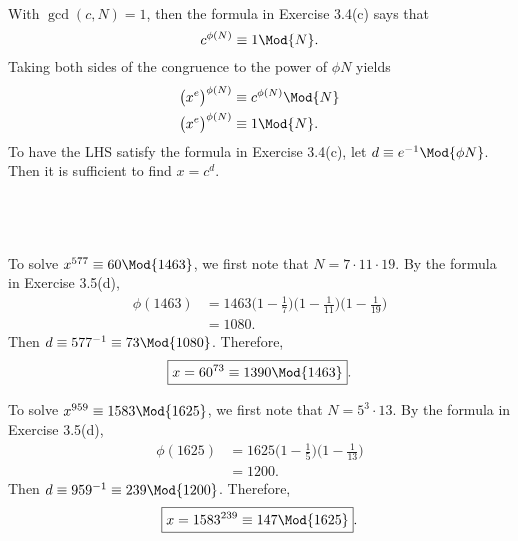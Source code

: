 \documentclass[
  coursecode={MTHE 418},
  assignmentname={Homework \homeworknumber},
  studentnumber=20053722,
  name={Bryan Hoang},
  draft,
]{
  ltxanswer%
}
\date{2022-02-28}
\begin{document}
  \begin{questions}
    \setcounter{question}{\questionnumber}
    \addtocounter{question}{-1}
    \question[10]\
    \begin{parts}
      \part{}
      \begin{solution}
        With \(\gcd(c, N) = 1\), then the formula in
        Exercise 3.4(c) says that
        \begin{equation}
          c^{\phi(N)} \equiv 1 \Mod{N}.
        \end{equation}
        Taking both sides of the congruence to the power of \(\phi{N}\) yields
        \begin{align*}
          \bigl(x^{e}\bigr)^{\phi(N)} &\equiv c^{\phi(N)} \Mod{N} \\
          \bigl(x^{e}\bigr)^{\phi(N)} &\equiv 1 \Mod{N}.
        \end{align*}
        To have the LHS satisfy the formula in Exercise 3.4(c), let \(d \equiv e^{-1} \Mod{\phi{N}}\). Then it is sufficient to find \(x = c^{d}\).
      \end{solution}

      \part{}\
      \begin{subparts}
        \subpart{}
        \begin{solution}
          To solve \(x^{577} \equiv 60 \Mod{1463}\), we first note that \(N = 7 \cdot 11 \cdot 19\). By the formula in Exercise 3.5(d),
          \begin{align*}
            \phi(1463) &= 1463 \biggl(1 - \frac{1}{7}\biggr) \biggl(1 - \frac{1}{11}\biggr) \biggl(1 - \frac{1}{19}\biggr) \\
                       &= 1080.
          \end{align*}
          Then \(d \equiv 577^{-1} \equiv 73 \Mod{1080}\). Therefore,
          \begin{equation*}
            \boxed{x = 60^{73} \equiv 1390 \Mod{1463}}.
          \end{equation*}
        \end{solution}

        \subpart{}
        \begin{solution}
          To solve \(x^{959} \equiv 1583 \Mod{1625}\), we first note that \(N = 5^{3} \cdot 13\). By the formula in Exercise 3.5(d),
          \begin{align*}
            \phi(1625) &= 1625 \biggl(1 - \frac{1}{5}\biggr) \biggl(1 - \frac{1}{13}\biggr) \\
                       &= 1200.
          \end{align*}
          Then \(d \equiv 959^{-1} \equiv 239 \Mod{1200}\). Therefore,
          \begin{equation*}
            \boxed{x = 1583^{239} \equiv 147 \Mod{1625}}.
          \end{equation*}
        \end{solution}


\end{subparts}
\end{parts}
\end{questions}
\end{document}
